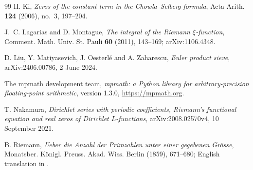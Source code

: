 \documentclass[11pt]{article}
\theoremstyle{plain}
\theoremstyle{definition}
\theoremstyle{remark}
\begin{document}
\begin{thebibliography}{99}
 H. Ki, \emph{Zeros of the constant term in the
Chowla--Selberg formula}, Acta Arith. \textbf{124} (2006), no.~3, 197--204.

 J.~C. Lagarias and D. Montague, \emph{The integral of the
Riemann $\xi$-function}, Comment. Math. Univ. St. Pauli \textbf{60} (2011),
143--169; arXiv:1106.4348.

 D. Liu, Y. Matiyasevich, J. Oesterl\'e and
A. Zaharescu, \emph{Euler product sieve}, arXiv:2406.00786, 2 June 2024.

 The mpmath development team, \emph{mpmath: a Python
library for arbitrary-precision floating-point arithmetic}, version 1.3.0,
\url{https://mpmath.org}.

 T. Nakamura, \emph{Dirichlet series with periodic
coefficients, Riemann's functional equation and real zeros of Dirichlet
$L$-functions}, arXiv:2008.02570v4, 10 September 2021.

 B. Riemann, \emph{Ueber die Anzahl der Primzahlen unter
einer gegebenen Gr\"osse}, Monatsber. K\"onigl. Preuss. Akad. Wiss. Berlin
(1859), 671--680; English translation in \cite[Appendix]{Edw}.

\end{thebibliography}
\end{document}
